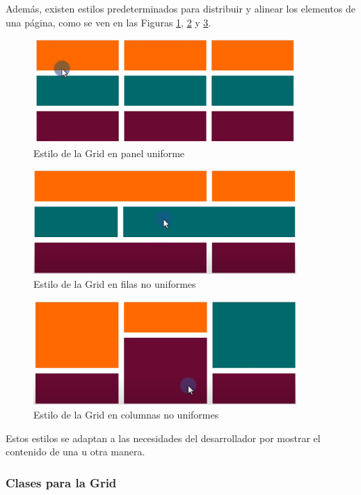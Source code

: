 Además, existen estilos predeterminados para distribuir y alinear los elementos de una página, como se ven en las Figuras \ref{fig:4}, \ref{fig:5} y \ref{fig:6}.
\begin{figure}[H]
    \centering
    \caption{Estilo de la Grid en panel uniforme}
    \label{fig:4}
    \includegraphics[width=10cm]{ss/grid-estilo1.png}
\end{figure}
\begin{figure}[H]
    \centering
    \caption{Estilo de la Grid en filas no uniformes}
    \label{fig:5}
    \includegraphics[width=10cm]{ss/grid-estilo2.png}
\end{figure}
\begin{figure}[H]
    \centering
    \caption{Estilo de la Grid en columnas no uniformes}
    \label{fig:6}
    \includegraphics[width=10cm]{ss/grid-estilo3.png}
\end{figure}

Estos estilos se adaptan a las necesidades del desarrollador por mostrar el contenido de una u otra manera.


\subsubsection{Clases para la Grid}


